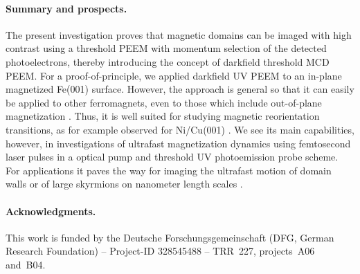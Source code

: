 \documentclass[prl,twocolumn,floatfix,superscriptaddress]{revtex4-2}
\begin{document}
\paragraph{Summary and prospects.} The present investigation proves that magnetic domains can be imaged with high contrast using a threshold PEEM with momentum selection of the detected photoelectrons, thereby introducing the concept of darkfield threshold MCD PEEM\@. 
For a proof-of-principle, we applied darkfield UV PEEM to an in-plane magnetized Fe(001) surface. However, the approach is general so that it can easily be applied to other ferromagnets, even to those which include out-of-plane magnetization \cite{kronseder2011}. Thus, it is well suited for studying magnetic reorientation transitions, as for example observed for Ni/Cu(001) \cite{henk1999,sander2004,nakagawa2006,kronseder2011}. We see its main capabilities, however, in investigations of ultrafast magnetization dynamics using femtosecond laser pulses in a optical pump and threshold UV photoemission probe scheme. For applications it paves the way for imaging the ultrafast motion of domain walls \cite{parkin2008} or of large skyrmions on nanometer length scales \cite{goebel2019,jani2021,kern2022}.

\paragraph{Acknowledgments.} This work is funded by the Deutsche Forschungsgemeinschaft (DFG, German Research Foundation) -- Project-ID 328545488 -- TRR~227, projects~A06 and~B04.

% 


\listoftodos
\end{document}
